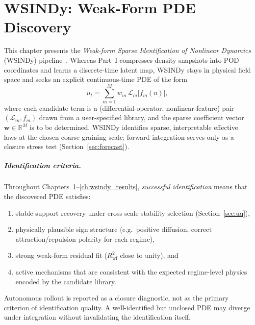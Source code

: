 \chapter{WSINDy: Weak-Form PDE Discovery}
\label{ch:wsindy_methodology}

This chapter presents the \emph{Weak-form Sparse Identification of
Nonlinear Dynamics} (WSINDy) pipeline~\cite{messenger2021wsindy}.
Whereas Part~I compresses density snapshots into POD coordinates and
learns a discrete-time latent map, WSINDy stays in physical field space
and seeks an explicit continuous-time PDE of the form
\begin{equation}
  u_t = \sum_{m=1}^{M} w_m\,\mathcal{L}_m\!\bigl[f_m(u)\bigr],
  \label{eq:wsindy_general}
\end{equation}
where each candidate term is a (differential-operator, nonlinear-feature)
pair $(\mathcal{L}_m, f_m)$ drawn from a user-specified library, and the
sparse coefficient vector $\mathbf{w}\in\mathbb{R}^M$ is to be determined.
WSINDy identifies sparse, interpretable effective laws at the chosen
coarse-graining scale; forward integration serves only as a closure
stress test (Section~\ref{sec:forecast}).

\paragraph{Identification criteria.}
Throughout Chapters~\ref{ch:wsindy_methodology}--\ref{ch:wsindy_results}, \emph{successful identification}
means that the discovered PDE satisfies:
\begin{enumerate}[nosep,label=(\roman*)]
  \item stable support recovery under cross-scale stability selection
        (Section~\ref{sec:uq}),
  \item physically plausible sign structure (e.g.\ positive diffusion,
        correct attraction/repulsion polarity for each regime),
  \item strong weak-form residual fit ($R^2_{\mathrm{wf}}$ close to unity),
        and
  \item active mechanisms that are consistent with the expected
        regime-level physics encoded by the candidate library.
\end{enumerate}
Autonomous rollout is reported as a closure diagnostic, not as the primary
criterion of identification quality.  A well-identified but unclosed PDE
may diverge under integration without invalidating the identification itself.

